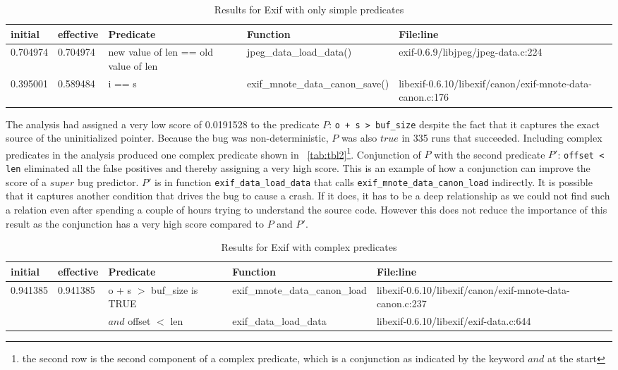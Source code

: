 \begin{table*}
\nocaptionrule
\caption{Results for Exif with only simple predicates}
\label{tab:tbl1}
\centering
\scriptsize
\begin{tabular}{lllll}
\toprule
initial & effective & Predicate & Function & File:line \\
\midrule
0.704974 & 0.704974 & new value of len == old value of len & jpeg\_data\_load\_data() & exif-0.6.9/libjpeg/jpeg-data.c:224 \\
0.395001 & 0.589484 & i == s & exif\_mnote\_data\_canon\_save() & libexif-0.6.10/libexif/canon/exif-mnote-data-canon.c:176 \\
\bottomrule
\end{tabular}
\end{table*}

The analysis had assigned a very low score of 0.0191528 to the predicate $P$: \texttt{o + s > buf\_size} despite the fact that it captures the exact source of the uninitialized pointer.  Because the bug was non-deterministic, $P$ was also $true$ in 335 runs that succeeded.  Including complex predicates in the analysis produced one complex predicate shown in ~\autoref{tab:tbl2}{\footnote{the second row is the second component of a complex predicate, which is a conjunction as indicated by the keyword $and$ at the start}}.  Conjunction of $P$ with the second predicate $P'$: \texttt{offset < len} eliminated all the false positives and thereby assigning a very high score.  This is an example of how a conjunction can improve the score of a $super$ bug predictor.  $P'$ is in function \texttt{exif\_data\_load\_data} that calls \texttt{exif\_mnote\_data\_canon\_load} indirectly.  It is possible that it captures another condition that drives the bug to cause a crash.  If it does, it has to be a deep relationship as we could not find such a relation even after spending a couple of hours trying to understand the source code.  However this does not reduce the importance of this result as the conjunction has a very high score compared to $P$ and $P'$.

\begin{table*}
\nocaptionrule
\caption{Results for Exif with complex predicates}
\label{tab:tbl2}
\centering
\scriptsize
\begin{tabular}{lllll}
\toprule
initial & effective & Predicate & Function & File:line \\
\midrule
0.941385 & 0.941385 & o + s $>$ buf\_size is TRUE & exif\_mnote\_data\_canon\_load &
 libexif-0.6.10/libexif/canon/exif-mnote-data-canon.c:237 \\
 
         &          & $and$ offset $<$ len & exif\_data\_load\_data & libexif-0.6.10/libexif/exif-data.c:644 \\
\bottomrule
\end{tabular}
\end{table*}

